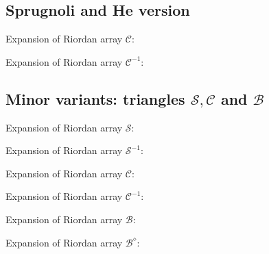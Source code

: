 \documentclass[11pt,a4paper]{article} %
\begin{document}
    
    

    \subsection{Sprugnoli and He version}

    Expansion of Riordan array $\mathcal{C}$:
    
    Expansion of Riordan array $\mathcal{C}^{-1}$:
    

    
    
    
    

    \subsection{Minor variants: triangles $\mathcal{S}, \mathcal{C}$ and $\mathcal{B}$}

    Expansion of Riordan array $\mathcal{S}$:
    
    Expansion of Riordan array $\mathcal{S}^{-1}$:
    
    Expansion of Riordan array $\mathcal{C}$:
    
    Expansion of Riordan array $\mathcal{C}^{-1}$:
    
    Expansion of Riordan array $\mathcal{B}$:
    
    Expansion of Riordan array $\mathcal{B}^{\diamond}$:
    
\end{document}
